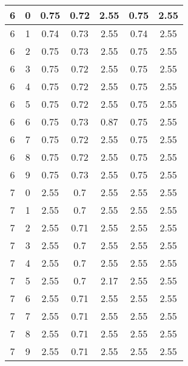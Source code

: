 \begin{longtable}{|c|c||c||c|c||c|c|}
	6 & 0 & 0.75 & 0.72 & 2.55 & 0.75 & 2.55 \\ \hline
	6 & 1 & 0.74 & 0.73 & 2.55 & 0.74 & 2.55 \\ \hline
	6 & 2 & 0.75 & 0.73 & 2.55 & 0.75 & 2.55 \\ \hline
	6 & 3 & 0.75 & 0.72 & 2.55 & 0.75 & 2.55 \\ \hline
	6 & 4 & 0.75 & 0.72 & 2.55 & 0.75 & 2.55 \\ \hline
	6 & 5 & 0.75 & 0.72 & 2.55 & 0.75 & 2.55 \\ \hline
	6 & 6 & 0.75 & 0.73 & 0.87 & 0.75 & 2.55 \\ \hline
	6 & 7 & 0.75 & 0.72 & 2.55 & 0.75 & 2.55 \\ \hline
	6 & 8 & 0.75 & 0.72 & 2.55 & 0.75 & 2.55 \\ \hline
	6 & 9 & 0.75 & 0.73 & 2.55 & 0.75 & 2.55 \\ \hline
	7 & 0 & 2.55 & 0.7 & 2.55 & 2.55 & 2.55 \\ \hline
	7 & 1 & 2.55 & 0.7 & 2.55 & 2.55 & 2.55 \\ \hline
	7 & 2 & 2.55 & 0.71 & 2.55 & 2.55 & 2.55 \\ \hline
	7 & 3 & 2.55 & 0.7 & 2.55 & 2.55 & 2.55 \\ \hline
	7 & 4 & 2.55 & 0.7 & 2.55 & 2.55 & 2.55 \\ \hline
	7 & 5 & 2.55 & 0.7 & 2.17 & 2.55 & 2.55 \\ \hline
	7 & 6 & 2.55 & 0.71 & 2.55 & 2.55 & 2.55 \\ \hline
	7 & 7 & 2.55 & 0.71 & 2.55 & 2.55 & 2.55 \\ \hline
	7 & 8 & 2.55 & 0.71 & 2.55 & 2.55 & 2.55 \\ \hline
	7 & 9 & 2.55 & 0.71 & 2.55 & 2.55 & 2.55 \\ \hline
\end{longtable}
\clearpage{}
